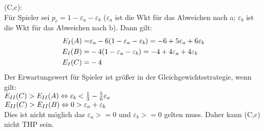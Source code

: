 \documentclass[a4paper, 11pt]{article}
\newcommand{\RM}[1]{\MakeUppercase{\romannumeral #1}}
\begin{document}
(C,c):\\
Für Spieler \RM{1} sei $p_c = 1- \varepsilon_a - \varepsilon_b$ ($\varepsilon_a$ ist die Wkt für das Abweichen nach a; $\varepsilon_b$ ist die Wkt für das Abweichen nach b). Dann gilt:\\
\begin{align*}
E_\RM{1}(A) = & \varepsilon_a - 6 (1-\varepsilon_a - \varepsilon_b) = -6 + 5\varepsilon_a + 6\varepsilon_b\\
E_\RM{1}(B) = & -4(1 - \varepsilon_a - \varepsilon_b) = -4 + 4\varepsilon_a + 4\varepsilon_b\\
E_\RM{1}(C) = & -4
\end{align*} 
Der Erwartungswert für Spieler \RM{1} ist größer in der Gleichgewichtsstrategie, wenn gilt:\\
$E_\RM{2}(C) > E_\RM{2}(A) \Leftrightarrow  \varepsilon_b < \frac{1}{3} - \frac{5}{6}\varepsilon_a$\\
$E_\RM{2}(C) > E_\RM{2}(B) \Leftrightarrow 0 > \varepsilon_a + \varepsilon_b$\\
Dies ist nicht möglich das $\varepsilon_a >= 0$ und $\varepsilon_b >= 0$ gelten muss. Daher kann (C,c) nicht THP sein.
\end{document}
